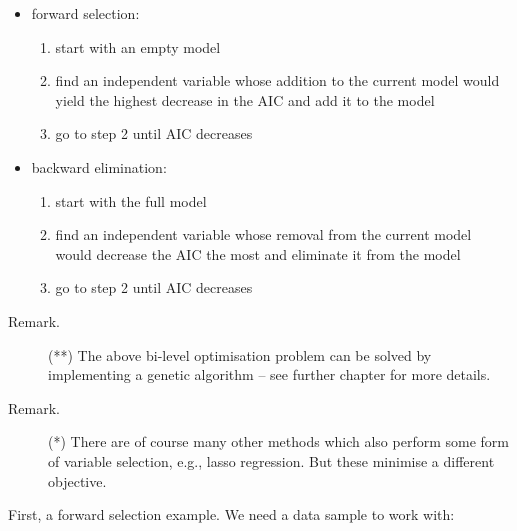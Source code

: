 \documentclass[10pt,b5paper,krantz1]{krantz}
\newenvironment{Shaded}{\begin{snugshade}}{\end{snugshade}}
\newcommand{\DecValTok}[1]{\textcolor[rgb]{0.06,0.06,0.06}{#1}}
\newcommand{\KeywordTok}[1]{\textcolor[rgb]{0.27,0.27,0.27}{\textbf{#1}}}
\newcommand{\NormalTok}[1]{#1}
\newcommand{\OperatorTok}[1]{\textcolor[rgb]{0.43,0.43,0.43}{\textbf{#1}}}
\newcommand{\StringTok}[1]{\textcolor[rgb]{0.5,0.5,0.5}{#1}}
\providecommand{\tightlist}{%
  \setlength{\itemsep}{0pt}\setlength{\parskip}{0pt}}
\begin{document}
\begin{itemize}
\item
  forward selection:

  \begin{enumerate}
  \def\labelenumi{\arabic{enumi}.}
  \tightlist
  \item
    start with an empty model
  \item
    find an independent variable
    whose addition to the current model would yield the highest decrease in the AIC and add it to the model
  \item
    go to step 2 until AIC decreases
  \end{enumerate}
\item
  backward elimination:

  \begin{enumerate}
  \def\labelenumi{\arabic{enumi}.}
  \tightlist
  \item
    start with the full model
  \item
    find an independent variable
    whose removal from the current model would decrease the AIC the most and eliminate it from the model
  \item
    go to step 2 until AIC decreases
  \end{enumerate}
\end{itemize}

\begin{description}
\item[Remark.]
(**) The above bi-level optimisation problem
can be solved by implementing a genetic algorithm -- see further chapter for more details.
\item[Remark.]
(*) There are of course many other methods which also perform
some form of variable selection, e.g., lasso regression.
But these minimise a different objective.
\end{description}

First, a forward selection example.
We need a data sample to work with:

\begin{Shaded}
\end{Shaded}
\end{document}
